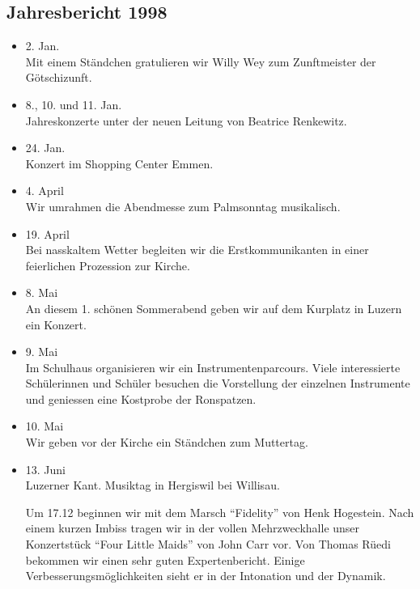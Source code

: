 \subsection{Jahresbericht 1998}
\begin{history}


    \begin{itemize}

        \item[]2. Jan.\\
        Mit einem Ständchen gratulieren wir Willy Wey zum Zunftmeister der
        Götschizunft.

        \item[]8., 10. und 11. Jan.\\
        Jahreskonzerte unter der neuen Leitung von Beatrice Renkewitz.

        \item[]24. Jan.\\
        Konzert im Shopping Center Emmen.

        \item[]4. April\\
        Wir umrahmen die Abendmesse zum Palmsonntag musikalisch.

        \item[]19. April\\
        Bei nasskaltem Wetter begleiten wir die Erstkommunikanten in einer
        feierlichen Prozession zur Kirche.

        \item[]8. Mai\\
        An diesem 1. schönen Sommerabend geben wir auf dem Kurplatz in Luzern
        ein Konzert.

        \item[]9. Mai\\
        Im Schulhaus organisieren wir ein Instrumentenparcours. Viele
        interessierte Schülerinnen und Schüler besuchen die Vorstellung der
        einzelnen Instrumente und geniessen eine Kostprobe der Ronspatzen.

        \item[]10. Mai\\
        Wir geben vor der Kirche ein Ständchen zum Muttertag.

        \item[]13. Juni\\
        Luzerner Kant. Musiktag in Hergiswil bei Willisau.

        Um 17.12 beginnen wir
        mit dem Marsch \enquote{Fidelity} von Henk Hogestein. Nach einem kurzen
        Imbiss tragen wir in der vollen Mehrzweckhalle unser Konzertstück
        \enquote{Four Little Maids} von John Carr vor. Von Thomas Rüedi bekommen
        wir einen sehr guten Expertenbericht. Einige Verbesserungsmöglichkeiten
        sieht er in der Intonation und der Dynamik.


\end{itemize}
\end{history}
